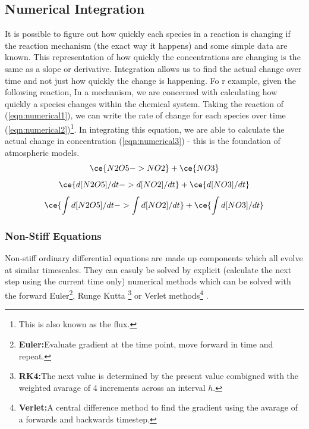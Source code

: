 \subsection{Numerical Integration}
It is possible to figure out how quickly each species in a reaction is changing if the reaction mechanism (the exact way it happens) and some simple data are known. This representation of how quickly the concentrations are changing is the same as a slope or derivative. Integration allows us to find the actual change over time and not just how quickly the change is happening. Fo r example, given the following reaction,
In a mechanism, we are concerned with calculating how quickly a species changes within the chemical system. Taking the reaction of  (\autoref{eqn:numerical1}), we can write the rate of change for each species over time (\autoref{eqn:numerical2})\footnote{This is also known as the flux.}. In integrating this equation, we are able to calculate the actual change in concentration (\autoref{eqn:numerical3}) - this is the foundation of atmospheric models.
\begin{equation}
\ce{N2O5 ->    NO2} + \ce{NO3}
\label{eqn:numerical1}
\end{equation}
\begin{equation}
\ce{ d[N2O5]/dt ->    d[NO2]/dt} + \ce{d[NO3]/dt}
\label{eqn:numerical2}
\end{equation}
\begin{equation}
\ce{ \int d[N2O5]/dt ->    \int d[NO2]/dt} + \ce{\int d[NO3]/dt}
\label{eqn:numerical3}
\end{equation}
\subsubsection{Non-Stiff Equations}
Non-stiff ordinary differential equations are made up components which all evolve at similar timescales. They can easuly be solved by explicit (calculate the next step using the current time only) numerical methods which can be solved with the forward Euler\footnote{\textbf{Euler:}Evaluate gradient at the time point, move forward in time and repeat.}, Runge Kutta \footnote{\textbf{RK4:}The next value is determined by the present value combigned with the weighted avarage of 4 increments across an interval $h$.} or Verlet methods\footnote{\textbf{Verlet:}A central difference method to find the gradient using the avarage of a forwards and backwards timestep.} \citep{advnummeth,wild}.   


% 
